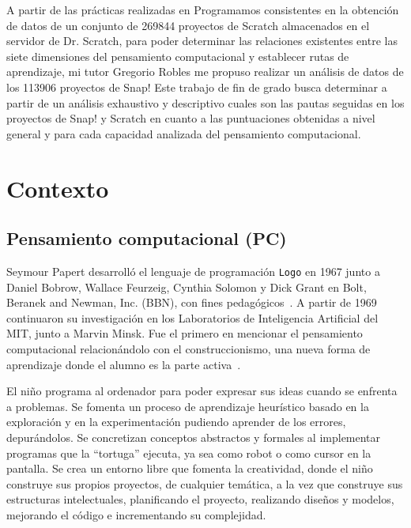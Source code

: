 \documentclass[a4paper, 12pt]{book}
\begin{document}
A partir de las prácticas realizadas en Programamos consistentes en la obtención de datos de un conjunto de 269844 proyectos de Scratch almacenados en el servidor de Dr. Scratch, para poder determinar las relaciones existentes entre las siete dimensiones del pensamiento computacional y establecer rutas de aprendizaje, mi tutor Gregorio Robles me propuso realizar un análisis de datos de los 113906 proyectos de Snap! Este trabajo de fin de grado busca determinar a partir de un análisis exhaustivo y descriptivo cuales son las pautas seguidas en los proyectos de Snap! y Scratch en cuanto a las puntuaciones obtenidas a nivel general y para cada capacidad analizada del pensamiento computacional. 

\section{Contexto}
\label{sec:contexto}

\subsection{Pensamiento computacional (PC)}
\label{subsec:pc}
Seymour Papert desarrolló el lenguaje de programación \texttt{Logo} en 1967 junto a Daniel Bobrow, Wallace Feurzeig, Cynthia Solomon y Dick Grant en Bolt, Beranek and Newman, Inc. (BBN), con fines pedagógicos~\cite{solomon20:_history}. A partir de 1969 continuaron su investigación en los Laboratorios de Inteligencia Artificial del MIT, junto a Marvin Minsk. Fue el primero en mencionar el pensamiento computacional relacionándolo con el construccionismo, una nueva forma de aprendizaje donde el alumno es la parte activa~\cite{papert80:_mindstorm}.

El niño programa al ordenador para poder expresar sus ideas cuando se enfrenta a problemas. Se fomenta un proceso de aprendizaje heurístico basado en la exploración y en la experimentación pudiendo aprender de los errores, depurándolos. Se concretizan conceptos abstractos y formales al implementar programas que la ``tortuga'' ejecuta, ya sea como robot o como cursor en la pantalla. Se crea un entorno libre que fomenta la creatividad, donde el niño construye sus propios proyectos, de cualquier temática, a la vez que construye sus estructuras intelectuales, planificando el proyecto, realizando diseños y modelos, mejorando el código e incrementando su complejidad.
\end{document}
